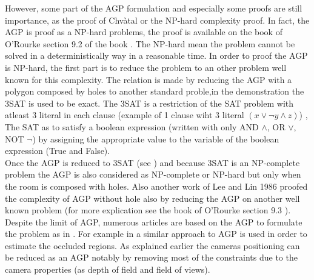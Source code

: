 However, some part of the AGP formulation and especially some proofs are still importance, as the proof of Chvàtal \cite{44*chvatal1975} or the NP-hard complexity proof. 
In fact, the AGP is proof as a NP-hard problems, the proof is available on the book of O’Rourke section 9.2 of the book \cite{219*orourke1987}.  The NP-hard mean the problem cannot be solved in a deterministically way in a reasonable time. 
In order to proof the AGP is  NP-hard, the first part is to reduce the  problem to an other problem well known for this complexity. The relation is made by reducing the AGP with a polygon composed by  holes to another standard proble,in the demonstration the 3SAT is used to be exact. 
The 3SAT is a restriction of the SAT problem with atleast 3 literal in each clause (example of  1 clause wiht 3 literal $(x\lor \neg y \land z)$) , The SAT as to satisfy a boolean expression (written with only AND $\land$, OR $\lor$, NOT $\neg$) by assigning the appropriate value to the variable of the boolean expression (True and False).\\
Once the AGP is reduced to 3SAT (see \citep{227*tovey1984}) and because 3SAT is an NP-complete problem the AGP is  also considered as NP-complete or  NP-hard but only  when the room is composed with holes. Also another work of Lee and Lin 1986 proofed the complexity of AGP without hole also by reducing the AGP on another well known problem (for more explication see the book of O’Rourke  section 9.3 \cite{219*orourke1987}).
Despite the limit of AGP, numerous articles are based on the AGP to formulate the problem as in \cite{43*erdem2006,53*packer2008}. For example in \cite{43*erdem2006} a similar approach to AGP is used in order to estimate the occluded regions. 
As explained earlier the cameras positioning can be reduced as an AGP \cite{53*packer2008} notably by removing most of the constraints due to the camera properties (as depth of field and field of views). 

